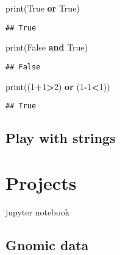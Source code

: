 \documentclass[
]{book}
\newenvironment{Shaded}{\begin{snugshade}}{\end{snugshade}}
\newcommand{\BuiltInTok}[1]{#1}
\newcommand{\DecValTok}[1]{\textcolor[rgb]{0.00,0.00,0.81}{#1}}
\newcommand{\KeywordTok}[1]{\textcolor[rgb]{0.13,0.29,0.53}{\textbf{#1}}}
\newcommand{\NormalTok}[1]{#1}
\newcommand{\OperatorTok}[1]{\textcolor[rgb]{0.81,0.36,0.00}{\textbf{#1}}}
\newcommand{\VariableTok}[1]{\textcolor[rgb]{0.00,0.00,0.00}{#1}}
\begin{document}
\begin{Shaded}
\begin{Highlighting}[]
\BuiltInTok{print}\NormalTok{(}\VariableTok{True} \KeywordTok{or} \VariableTok{True}\NormalTok{)}
\end{Highlighting}
\end{Shaded}

\begin{verbatim}
## True
\end{verbatim}

\begin{Shaded}
\begin{Highlighting}[]
\BuiltInTok{print}\NormalTok{(}\VariableTok{False} \KeywordTok{and} \VariableTok{True}\NormalTok{)}
\end{Highlighting}
\end{Shaded}

\begin{verbatim}
## False
\end{verbatim}

\begin{Shaded}
\begin{Highlighting}[]
\BuiltInTok{print}\NormalTok{((}\DecValTok{1}\OperatorTok{+}\DecValTok{1}\OperatorTok{\textgreater{}}\DecValTok{2}\NormalTok{) }\KeywordTok{or}\NormalTok{ (}\DecValTok{1}\OperatorTok{{-}}\DecValTok{1}\OperatorTok{\textless{}}\DecValTok{1}\NormalTok{))}
\end{Highlighting}
\end{Shaded}

\begin{verbatim}
## True
\end{verbatim}

\hypertarget{play-with-strings}{%
\subsection{Play with strings}\label{play-with-strings}}

\hypertarget{projects}{%
\section{Projects}\label{projects}}

jupyter notebook

\hypertarget{gnomic-data}{%
\subsection{Gnomic data}\label{gnomic-data}}
\end{document}
